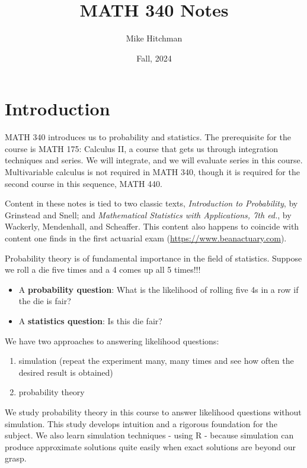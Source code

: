 \documentclass[
]{book}
\title{MATH 340 Notes}
\author{Mike Hitchman}
\date{Fall, 2024}
\providecommand{\tightlist}{%
  \setlength{\itemsep}{0pt}\setlength{\parskip}{0pt}}
\theoremstyle{definition}
\theoremstyle{definition}
\theoremstyle{definition}
\theoremstyle{definition}
\theoremstyle{remark}
\begin{document}
\maketitle

{
\setcounter{tocdepth}{1}
\tableofcontents
}
\chapter{Introduction}\label{introduction}

MATH 340 introduces us to probability and statistics. The prerequisite for the course is MATH 175: Calculus II, a course that gets us through integration techniques and series. We will integrate, and we will evaluate series in this course. Multivariable calculus is not required in MATH 340, though it is required for the second course in this sequence, MATH 440.

Content in these notes is tied to two classic texts, \emph{Introduction to Probability}, by Grinstead and Snell; and \emph{Mathematical Statistics with Applications, 7th ed.}, by Wackerly, Mendenhall, and Scheaffer. This content also happens to coincide with content one finds in the first actuarial exam (\url{https://www.beanactuary.com}).

Probability theory is of fundamental importance in the field of statistics. Suppose we roll a die five times and a 4 comes up all 5 times!!!

\begin{itemize}
\tightlist
\item
  A \textbf{probability question}: What is the likelihood of rolling five 4s in a row if the die is fair?
\item
  A \textbf{statistics question}: Is this die fair?
\end{itemize}

We have two approaches to answering likelihood questions:

\begin{enumerate}
\def\labelenumi{\arabic{enumi}.}
\tightlist
\item
  simulation (repeat the experiment many, many times and see how often the desired result is obtained)
\item
  probability theory
\end{enumerate}

We study probability theory in this course to answer likelihood questions without simulation. This study develops intuition and a rigorous foundation for the subject. We also learn simulation techniques - using R - because simulation can produce approximate solutions quite easily when exact solutions are beyond our grasp.
\end{document}
